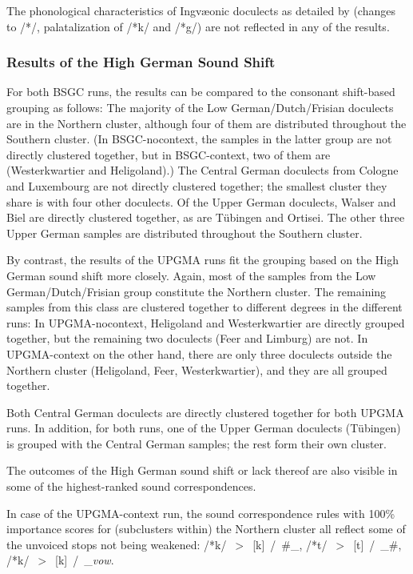 \documentclass[a4paper]{article}
\begin{document}
The phonological characteristics of Ingv\ae{}onic doculects
as detailed by \citet{stiles2013pan-west}
(changes to /*\textscripta{}/, palatalization of /*k/ and /*g/)
are not reflected in any of the results.

\subsubsection{Results of the High German Sound Shift}

For both BSGC runs, the results can be compared to the consonant shift-based grouping as follows:
The majority of the Low German/Dutch/Frisian doculects are in
the Northern cluster,
although four of them are distributed throughout the Southern cluster.
(In BSGC-nocontext,
the samples in the latter group are not directly clustered together,
but in BSGC-context,
two of them are (Westerkwartier and Heligoland).)
The Central German doculects from Cologne and Luxembourg
are not directly clustered together; the smallest cluster they share
is with four other doculects.
Of the Upper German doculects,
Walser and Biel are directly clustered together,
as are T\"{u}bingen and Ortisei.
The other three Upper German samples are distributed throughout
the Southern cluster.

By contrast, the results of the UPGMA runs fit
the grouping based on the High German sound shift more closely.
Again, most of the samples from the Low German/Dutch/Frisian group
constitute the Northern cluster.
The remaining samples from this class are clustered together
to different degrees in the different runs:
In UPGMA-nocontext,
Heligoland and Westerkwartier are directly grouped together,
but the remaining two doculects (Feer and Limburg) are not.
In UPGMA-context on the other hand,
there are only three doculects outside the Northern cluster
(Heligoland, Feer, Westerkwartier),
and they are all grouped together.

Both Central German doculects are directly clustered together
for both UPGMA runs. In addition, for both runs, one of the
Upper German doculects (T\"{u}bingen) is grouped with the
Central German samples; the rest form their own cluster.

The outcomes of the High German sound shift or lack thereof
are also visible in some of the highest-ranked sound correspondences.

In case of the UPGMA-context run,
the sound correspondence rules with 100\% importance scores
for (subclusters within) the Northern cluster
all reflect some of the unvoiced stops not being weakened:
/*k/~$>$~[k]~/~\#\_, /*t/~$>$~[t]~/~\_\#, /*k/~$>$~[k]~/~\_\textit{vow}.
\end{document}
